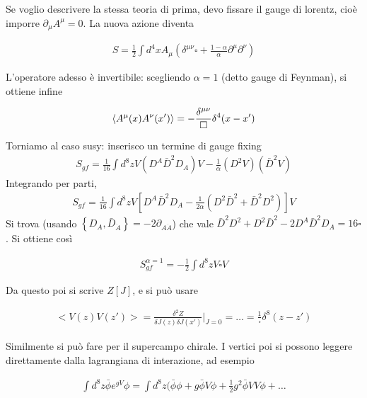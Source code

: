\documentclass{report}
\begin{document}
{    Se voglio descrivere la stessa teoria di prima, devo fissare il gauge di lorentz, cioè imporre \(\partial_\mu A^\mu = 0\). La nuova azione diventa 
    
    \begin{align}
        S = \frac{1}{2}\int d^4x A_\mu (\delta^{\mu\nu}\square + \frac{1-\alpha}{\alpha}\partial^\mu \partial^\nu)
    \end{align}

    L'operatore adesso è invertibile: scegliendo \(\alpha =1\) (detto gauge di Feynman), si ottiene infine 

    \begin{align}
        \braket{A^\mu(x)A^\nu(x')} = -\frac{\delta^{\mu\nu}}{\square}\delta^4(x-x')
    \end{align}

    Torniamo al caso susy: inserisco un termine di gauge fixing 
    \begin{align}
        S_{gf} = \frac{1}{16}\int d^8z V(D^A \bar{D}^2 D_A)V - \frac{1}{\alpha}(D^2 V)(\bar{D}^2 V)
    \end{align}
    Integrando per parti, 
    \begin{align}
        S_{gf} = \frac{1}{16}\int d^8z V[D^A \bar{D}^2 D_A -\frac{1}{2\alpha}(D^2\bar{D}^2 + \bar{D}^2 D^2)]V
    \end{align}
    Si trova (usando \(\left\{ D_A, \bar{D}_{\dot{A}} \right\} = -2\partial_{A\dot{A}}\)) che vale \(\bar{D}^2 D^2 + D^2 \bar{D}^2 -2D^A \bar{D}^2 D_A = 16\square\). Si ottiene così 
    
    \begin{align}
        S^{\alpha = 1}_{gf} = -\frac{1}{2}\int d^8z V\square V
    \end{align}

    Da questo poi si scrive \(Z[J]\), e si può usare 

    \begin{align}
        <V(z)V(z')> = \frac{\delta ^2 Z}{\delta J(z) \delta J(x')}\biggr|_{J=0} = \ldots = \frac{1}{\square}\delta^8(z-z')
    \end{align}
}

Similmente si può fare per il supercampo chirale. I vertici poi si possono leggere direttamente dalla lagrangiana di interazione, ad esempio 

\begin{align}
    \int d^8z \bar{\phi}e^{gV}\phi = \int d^8z (\bar{\phi}\phi + g\bar{\phi}V \phi + \frac{1}{2}g^2 \bar{\phi}VV\phi + \ldots 
\end{align}
\end{document}
